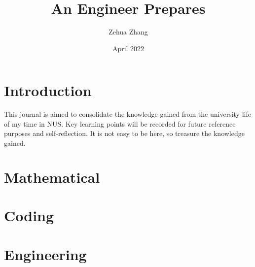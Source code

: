 \documentclass{article}
\title{An Engineer Prepares}
\author{Zehua Zhang}
\date{April 2022}
\begin{document}
\maketitle
\newpage
\tableofcontents

\newpage
\section*{Introduction}
This journal is aimed to consolidate the knowledge gained from the university life of my time in NUS. Key learning points will be recorded for future reference purposes and self-reflection. It is not easy to be here, so treasure the knowledge gained.

\section{Mathematical}



\section{Coding}




\section{Engineering}







\end{document}
